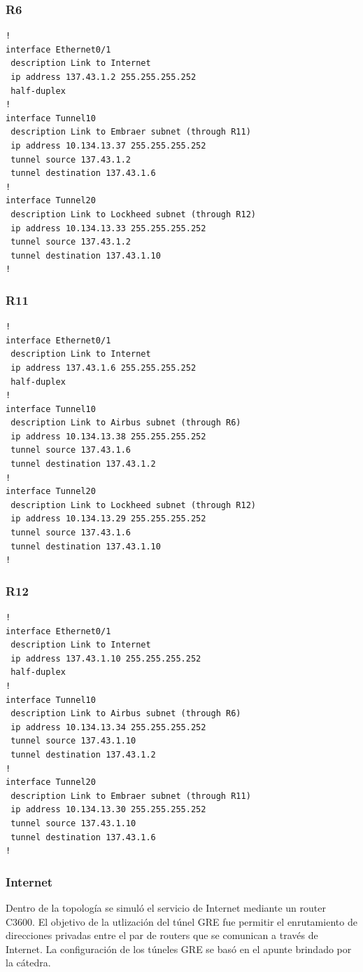 \documentclass[12pt, a4paper, spanish]{article}
\begin{document}
\subsubsection{R6}
{\small
\begin{verbatim}
!
interface Ethernet0/1
 description Link to Internet
 ip address 137.43.1.2 255.255.255.252
 half-duplex
!
interface Tunnel10
 description Link to Embraer subnet (through R11)
 ip address 10.134.13.37 255.255.255.252
 tunnel source 137.43.1.2
 tunnel destination 137.43.1.6
!
interface Tunnel20
 description Link to Lockheed subnet (through R12)
 ip address 10.134.13.33 255.255.255.252
 tunnel source 137.43.1.2
 tunnel destination 137.43.1.10
!
\end{verbatim}
}

\subsubsection{R11}
{\small
\begin{verbatim}
!
interface Ethernet0/1
 description Link to Internet
 ip address 137.43.1.6 255.255.255.252
 half-duplex
!
interface Tunnel10
 description Link to Airbus subnet (through R6)
 ip address 10.134.13.38 255.255.255.252
 tunnel source 137.43.1.6
 tunnel destination 137.43.1.2
!
interface Tunnel20
 description Link to Lockheed subnet (through R12)
 ip address 10.134.13.29 255.255.255.252
 tunnel source 137.43.1.6
 tunnel destination 137.43.1.10
!
\end{verbatim}
}

\subsubsection{R12}
{\small
\begin{verbatim}
!
interface Ethernet0/1
 description Link to Internet
 ip address 137.43.1.10 255.255.255.252
 half-duplex
!
interface Tunnel10
 description Link to Airbus subnet (through R6)
 ip address 10.134.13.34 255.255.255.252
 tunnel source 137.43.1.10
 tunnel destination 137.43.1.2
!
interface Tunnel20
 description Link to Embraer subnet (through R11)
 ip address 10.134.13.30 255.255.255.252
 tunnel source 137.43.1.10
 tunnel destination 137.43.1.6
!
\end{verbatim}
}

\subsubsection{Internet}

Dentro de la topología se simuló el servicio de Internet mediante un 
router C3600.
El objetivo de la utlización del túnel GRE fue permitir el enrutamiento de 
direcciones privadas entre el par de routers que se comunican a través de 
Internet.
La configuración de los túneles GRE se basó en el apunte brindado por la 
cátedra. 
\end{document}
